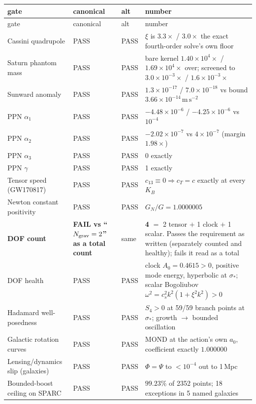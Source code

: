 \documentclass[11pt,letterpaper]{article}
\newcommand{\ms}{\,\mathrm{m\,s^{-2}}}
\begin{document}
\begin{small}
\begin{longtable}{L{0.205\textwidth}L{0.145\textwidth}L{0.14\textwidth}L{0.37\textwidth}}
\toprule
gate & canonical & alt & number\\\midrule
\endfirsthead
\toprule
gate & canonical & alt & number\\\midrule
\endhead
Cassini quadrupole & PASS & PASS & $\xi$ is $3.3\times$ / $3.0\times$ the exact fourth-order solve's own floor\\
Saturn phantom mass & PASS & PASS & bare kernel $1.40\times10^{4}\times$ / $1.69\times10^{4}\times$ over; screened to $3.0\times10^{-3}\times$ / $1.6\times10^{-3}\times$\\
Sunward anomaly & PASS & PASS & $1.3\times10^{-17}$ / $7.0\times10^{-18}$ vs bound $3.66\times10^{-14}\ms$\\
PPN $\alpha_1$ & PASS & PASS & $-4.48\times10^{-6}$ / $-4.25\times10^{-6}$ vs $10^{-4}$\\
PPN $\alpha_2$ & PASS & PASS & $-2.02\times10^{-7}$ vs $4\times10^{-7}$ (margin $1.98\times$)\\
PPN $\alpha_3$ & PASS & PASS & 0 exactly\\
PPN $\gamma$ & PASS & PASS & 1 exactly\\
Tensor speed (GW170817) & PASS & PASS & $c_{13}\equiv0\Rightarrow c_T=c$ exactly at every $K_B$\\
Newton constant positivity & PASS & PASS & $G_N/G=1.0000005$\\
\textbf{DOF count} & \textbf{FAIL vs ``$N_{\rm grav}=2$'' as a total count} & same & \textbf{4} $=$ 2 tensor $+$ 1 clock $+$ 1 scalar. Passes the requirement as written (separately counted and healthy); fails it read as a total\\
DOF health & PASS & PASS & clock $A_0=0.4615>0$, positive mode energy, hyperbolic at $\sigma_*$; scalar Bogoliubov $\omega^2=c_s^2k^2(1+\xi^2k^2)>0$\\
Hadamard well-posedness & PASS & PASS & $S_4>0$ at 59/59 branch points at $\sigma_*$; growth $\to$ bounded oscillation\\
Galactic rotation curves & PASS & PASS & MOND at the action's own $a_0$, coefficient exactly $1.000000$\\
Lensing/dynamics slip (galaxies) & PASS & PASS & $\Phi=\Psi$ to $<10^{-4}$ out to 1\,Mpc\\
Bounded-boost ceiling on SPARC & PASS & PASS & $99.23\%$ of 2352 points; 18 exceptions in 5 named galaxies\\

\end{longtable}
\end{small}
\end{document}
